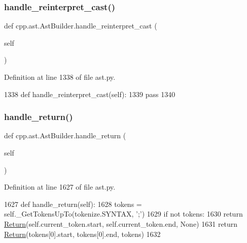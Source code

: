 \subsubsection{\texorpdfstring{handle\+\_\+reinterpret\+\_\+cast()}{handle\_reinterpret\_cast()}}
{\footnotesize\ttfamily def cpp.\+ast.\+Ast\+Builder.\+handle\+\_\+reinterpret\+\_\+cast (\begin{DoxyParamCaption}\item[{}]{self }\end{DoxyParamCaption})}



Definition at line 1338 of file ast.\+py.


\begin{DoxyCode}
1338     \textcolor{keyword}{def }handle\_reinterpret\_cast(self):
1339         \textcolor{keywordflow}{pass}
1340 
\end{DoxyCode}
\mbox{\label{classcpp_1_1ast_1_1AstBuilder_a8330d1f34d40b0e82495ec794575289d}} 
\subsubsection{\texorpdfstring{handle\+\_\+return()}{handle\_return()}}
{\footnotesize\ttfamily def cpp.\+ast.\+Ast\+Builder.\+handle\+\_\+return (\begin{DoxyParamCaption}\item[{}]{self }\end{DoxyParamCaption})}



Definition at line 1627 of file ast.\+py.


\begin{DoxyCode}
1627     \textcolor{keyword}{def }handle\_return(self):
1628         tokens = self.\_GetTokensUpTo(tokenize.SYNTAX, \textcolor{stringliteral}{';'})
1629         \textcolor{keywordflow}{if} \textcolor{keywordflow}{not} tokens:
1630             \textcolor{keywordflow}{return} \hyperlink{namespacetesting_af6d1c13e9376c77671e37545cd84359c}{Return}(self.current\_token.start, self.current\_token.end, \textcolor{keywordtype}{None})
1631         \textcolor{keywordflow}{return} \hyperlink{namespacetesting_af6d1c13e9376c77671e37545cd84359c}{Return}(tokens[0].start, tokens[0].end, tokens)
1632 
\end{DoxyCode}
\mbox{\label{classcpp_1_1ast_1_1AstBuilder_adf11f377386bdb44fe1094ff8adf9142}} 
